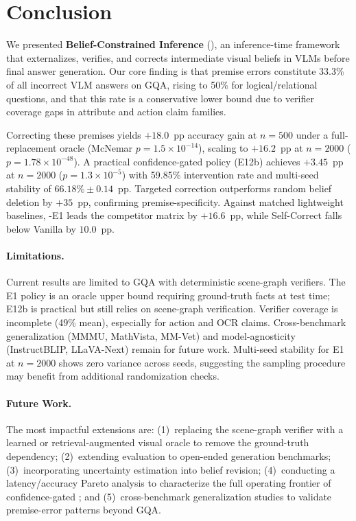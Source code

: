 \section{Conclusion}
\label{sec:conclusion}

We presented \textbf{Belief-Constrained Inference} (\bci{}), an inference-time
framework that externalizes, verifies, and corrects intermediate visual beliefs in
VLMs before final answer generation. Our core finding is that premise errors
constitute 33.3\% of all incorrect VLM answers on GQA, rising to 50\% for
logical/relational questions, and that this rate is a conservative lower bound due to
verifier coverage gaps in attribute and action claim families.

Correcting these premises yields $+18.0$~pp accuracy gain at $n{=}500$ under a
full-replacement oracle (McNemar $p{=}1.5{\times}10^{-14}$), scaling to $+16.2$~pp
at $n{=}2000$ ($p{=}1.78{\times}10^{-48}$). A practical confidence-gated policy
(E12b) achieves $+3.45$~pp at $n{=}2000$ ($p{=}1.3{\times}10^{-5}$) with
59.85\% intervention rate and multi-seed stability of $66.18\%\pm 0.14$~pp.
Targeted correction outperforms random belief deletion by $+35$~pp, confirming
premise-specificity. Against matched lightweight baselines, \bci-E1 leads the
competitor matrix by $+16.6$~pp, while Self-Correct falls below Vanilla by $10.0$~pp.

\paragraph{Limitations.}
Current results are limited to GQA with deterministic scene-graph verifiers.
The E1 policy is an oracle upper bound requiring ground-truth facts at test time;
E12b is practical but still relies on scene-graph verification.
Verifier coverage is incomplete (49\% mean), especially for action and OCR claims.
Cross-benchmark generalization (MMMU, MathVista, MM-Vet) and model-agnosticity
(InstructBLIP, LLaVA-Next) remain for future work.
Multi-seed stability for E1 at $n{=}2000$ shows zero variance across seeds,
suggesting the sampling procedure may benefit from additional randomization checks.

\paragraph{Future Work.}
The most impactful extensions are:
(1)~replacing the scene-graph verifier with a learned or retrieval-augmented visual
oracle to remove the ground-truth dependency;
(2)~extending evaluation to open-ended generation benchmarks;
(3)~incorporating uncertainty estimation into belief revision;
(4)~conducting a latency/accuracy Pareto analysis to characterize the full operating
frontier of confidence-gated \bci{};
and (5)~cross-benchmark generalization studies to validate premise-error patterns
beyond GQA.

